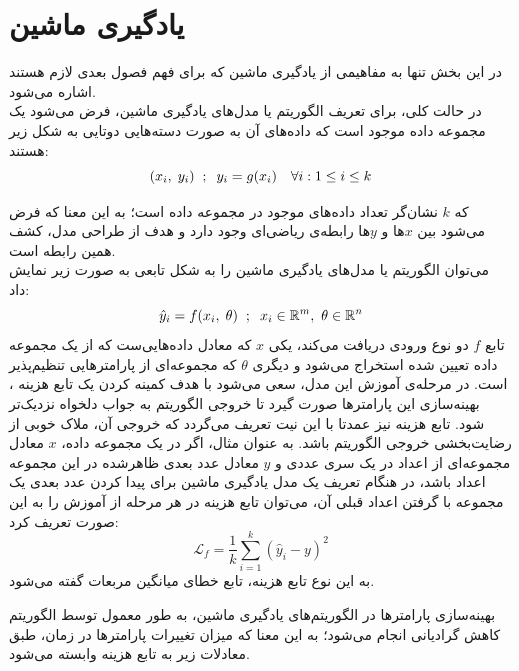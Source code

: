 
\section{یادگیری ماشین}
در این بخش تنها به مفاهیمی از یادگیری ماشین که برای فهم فصول بعدی لازم هستند اشاره می‌شود. \\
در حالت کلی، برای تعریف الگوریتم یا مدل‌های یادگیری ماشین، فرض می‌شود یک مجموعه داده موجود است که داده‌های آن به صورت دسته‌هایی دوتایی به شکل زیر هستند:
\begin{equation}
    (x_i, \hspace{1mm} y_i) \hspace{2mm} ; \hspace{2mm} y_i = g(x_i) \quad  \forall i : 1 \leq i \leq k
\end{equation}

که
$k$
نشان‌گر تعداد داده‌های موجود در مجموعه داده است؛
به این معنا که فرض می‌شود بین 
$x$ها
و
$y$ها
رابطه‌ی ریاضی‌ای وجود دارد و هدف از طراحی مدل، کشف همین رابطه است. \\
می‌توان الگوریتم یا مدل‌های یادگیری ماشین را به شکل تابعی به صورت زیر نمایش داد:
\begin{equation}
    \Hat{y}_i = f(x_i, \hspace{1mm} \theta) \hspace{2mm} ; \hspace{2mm} x_i \in \mathbb{R}^m, \hspace{1.2mm} \theta \in \mathbb{R}^n
\end{equation}
تابع
$f$
دو نوع ورودی دریافت می‌کند، یکی
$x$
که معادل داده‌هایی‌ست که از یک مجموعه داده تعیین شده استخراج می‌شود و دیگری
$\theta$
که مجموعه‌ای از پارامترهایی تنظیم‌پذیر است. در مرحله‌ی آموزش
این مدل، سعی می‌شود با هدف کمینه کردن یک تابع هزینه
،
بهینه‌سازی این پارامترها صورت گیرد تا خروجی الگوریتم به جواب دلخواه نزدیک‌تر شود.
تابع هزینه نیز عمدتا با این نیت تعریف می‌گردد که خروجی آن، ملاک خوبی از رضایت‌بخشی خروجی الگوریتم باشد. به عنوان مثال، اگر در یک مجموعه داده،
$x$
معادل مجموعه‌ای از اعداد در یک سری عددی
و
$y$
معادل عدد بعدی ظاهرشده در این مجموعه اعداد باشد، در هنگام تعریف یک مدل یادگیری ماشین برای پیدا کردن عدد بعدی یک مجموعه با گرفتن اعداد قبلی آن، می‌توان تابع هزینه در هر مرحله از آموزش را به این صورت تعریف کرد:
\begin{equation} \label{eqn:mse}
    \mathcal{L}_f = \frac{1}{k} \sum_{i=1}^{k} (\hat{y}_i - y)^2
\end{equation}
به این نوع تابع هزینه، تابع خطای میانگین مربعات
گفته می‌شود.

بهینه‌سازی پارامترها در الگوریتم‌های یادگیری ماشین، به طور معمول توسط الگوریتم کاهش گرادیانی
انجام می‌شود؛ به این معنا که میزان تغییرات پارامترها در زمان، طبق معادلات زیر به تابع هزینه وابسته می‌شود.

